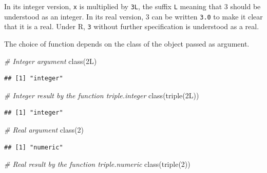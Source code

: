 \documentclass[
  12pt,
  american,
  a4paper,
  extrafontsizes,onecolumn,openright
  ]{memoir}
\newenvironment{Shaded}{\begin{snugshade}}{\end{snugshade}}
\newcommand{\CommentTok}[1]{\textcolor[rgb]{0.56,0.35,0.01}{\textit{#1}}}
\newcommand{\DecValTok}[1]{\textcolor[rgb]{0.00,0.00,0.81}{#1}}
\newcommand{\FunctionTok}[1]{\textcolor[rgb]{0.00,0.00,0.00}{#1}}
\newcommand{\NormalTok}[1]{#1}
\begin{document}
\normalsize

In its integer version, \texttt{x} is multiplied by \texttt{3L}, the suffix \texttt{L} meaning that 3 should be understood as an integer.
In its real version, 3 can be written \texttt{3.0} to make it clear that it is a real.
Under R, \texttt{3} without further specification is understood as a real.

The choice of function depends on the class of the object passed as argument.

\scriptsize

\begin{Shaded}
\begin{Highlighting}[]
\CommentTok{\# Integer argument}
\FunctionTok{class}\NormalTok{(2L)}
\end{Highlighting}
\end{Shaded}

\begin{verbatim}
## [1] "integer"
\end{verbatim}

\begin{Shaded}
\begin{Highlighting}[]
\CommentTok{\# Integer result by the function triple.integer}
\FunctionTok{class}\NormalTok{(}\FunctionTok{triple}\NormalTok{(2L))}
\end{Highlighting}
\end{Shaded}

\begin{verbatim}
## [1] "integer"
\end{verbatim}

\begin{Shaded}
\begin{Highlighting}[]
\CommentTok{\# Real argument}
\FunctionTok{class}\NormalTok{(}\DecValTok{2}\NormalTok{)}
\end{Highlighting}
\end{Shaded}

\begin{verbatim}
## [1] "numeric"
\end{verbatim}

\begin{Shaded}
\begin{Highlighting}[]
\CommentTok{\# Real result by the function triple.numeric}
\FunctionTok{class}\NormalTok{(}\FunctionTok{triple}\NormalTok{(}\DecValTok{2}\NormalTok{))}
\end{Highlighting}
\end{Shaded}
\end{document}
